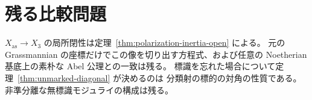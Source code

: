 \documentclass[a4paper,11pt]{ltjsarticle}
\numberwithin{equation}{section}
\theoremstyle{plain}
\theoremstyle{definition}
\theoremstyle{remark}
\begin{document}






\section{残る比較問題}\label{sec:moduli-remaining}
$X_{\mathrm{as}}\to X_3$ の局所閉性は定理~\ref{thm:polarization-inertia-open} による。
元の Grassmannian の座標だけでこの像を切り出す方程式、および任意の
Noetherian 基底上の素朴な Abel 公理との一致は残る。
標識を忘れた場合について定理~\ref{thm:unmarked-diagonal} が決めるのは
分類射の標的の対角の性質である。非準分離な無標識モジュライの構成は残る。



\end{document}
